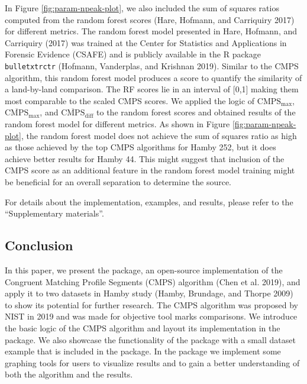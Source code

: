 In Figure \ref{fig:param-npeak-plot}, we also included the sum of squares ratios computed from the random forest scores (Hare, Hofmann, and Carriquiry 2017) for different metrics.
The random forest model presented in Hare, Hofmann, and Carriquiry (2017) was trained at the Center for Statistics and Applications in Forensic Evidence (CSAFE) and is publicly available in the R package \texttt{bulletxtrctr} (Hofmann, Vanderplas, and Krishnan 2019).
Similar to the CMPS algorithm, this random forest model produces a score to quantify the similarity of a land-by-land comparison.
The RF scores lie in an interval of {[}0,1{]} making them most comparable to the scaled CMPS scores.
We applied the logic of \(\mathrm{{CMPS}_{max}}\), \(\mathrm{\overline{CMPS}_{max}}\), and \(\mathrm{\overline{CMPS}_{diff}}\) to the random forest scores and obtained results of the random forest model for different metrics.
As shown in Figure \ref{fig:param-npeak-plot}, the random forest model does not achieve the sum of squares ratio as high as those achieved by the top CMPS algorithms for Hamby 252, but it does achieve better results for Hamby 44.
This might suggest that inclusion of the CMPS score as an additional feature in the random forest model training might be beneficial for an overall separation to determine the source.

For details about the implementation, examples, and results, please refer to the ``Supplementary materials''.

\hypertarget{conclusion}{%
\subsection{Conclusion}\label{conclusion}}

In this paper, we present the  package, an open-source implementation of the Congruent Matching Profile Segments (CMPS) algorithm (Chen et al. 2019), and apply it to two datasets in Hamby study (Hamby, Brundage, and Thorpe 2009) to show its potential for further research.
The CMPS algorithm was proposed by NIST in 2019 and was made for objective tool marks comparisons.
We introduce the basic logic of the CMPS algorithm and layout its implementation in the  package.
We also showcase the functionality of the  package with a small dataset example that is included in the package.
In the  package we implement some graphing tools for users to visualize results and to gain a better understanding of both the algorithm and the results.

